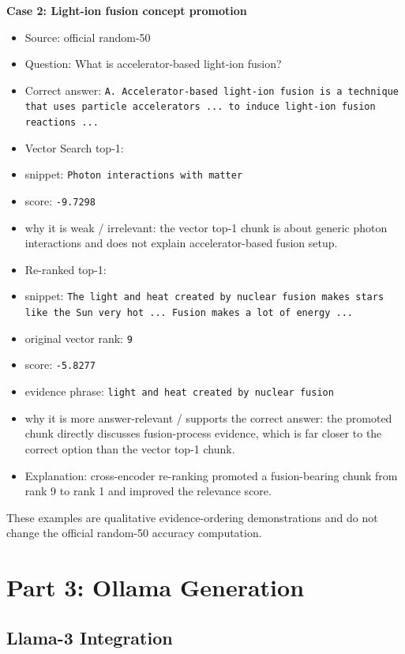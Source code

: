 \documentclass[12pt,a4paper]{article}
\begin{document}
\textbf{Case 2: Light-ion fusion concept promotion}

\begin{itemize}
    \item Source: official random-50
    \item Question: What is accelerator-based light-ion fusion?
    \item Correct answer: \texttt{A. Accelerator-based light-ion fusion is a technique that uses particle accelerators ... to induce light-ion fusion reactions ...}
    \item Vector Search top-1:
    \item snippet: \texttt{Photon interactions with matter}
    \item score: \texttt{-9.7298}
    \item why it is weak / irrelevant: the vector top-1 chunk is about generic photon interactions and does not explain accelerator-based fusion setup.
    \item Re-ranked top-1:
    \item snippet: \texttt{The light and heat created by nuclear fusion makes stars like the Sun very hot ... Fusion makes a lot of energy ...}
    \item original vector rank: \texttt{9}
    \item score: \texttt{-5.8277}
    \item evidence phrase: \texttt{light and heat created by nuclear fusion}
    \item why it is more answer-relevant / supports the correct answer: the promoted chunk directly discusses fusion-process evidence, which is far closer to the correct option than the vector top-1 chunk.
    \item Explanation: cross-encoder re-ranking promoted a fusion-bearing chunk from rank 9 to rank 1 and improved the relevance score.
\end{itemize}

These examples are qualitative evidence-ordering demonstrations and do not change the official random-50 accuracy computation.

\section{Part 3: Ollama Generation}

\subsection{Llama-3 Integration}
\end{document}
